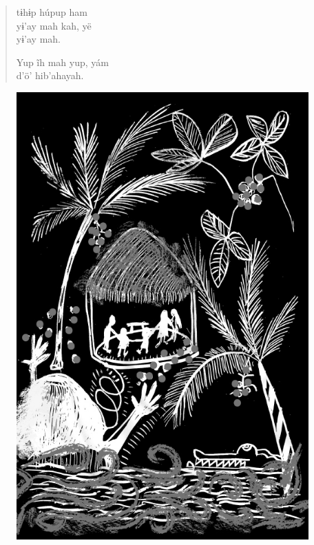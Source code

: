 \begin{verse}
tɨhɨp húpup ham\\
yɨ’ay mah kah, yë\\
yɨ’ay mah.

Yup ĩh mah yup, yám\\
d’ö’ hib’ahayah.
\end{verse}

\vspace*{\fill}

\begin{figure}
\vspace*{-1.2cm}
\hspace*{-2.2cm}\includegraphics[width=138mm]{./imgs/img8.jpg}
\end{figure}

